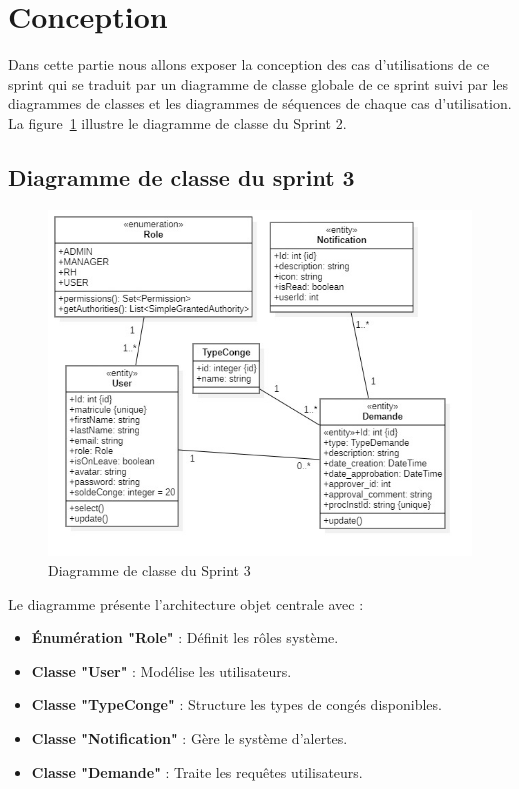 \section{Conception}
Dans cette partie nous allons exposer la conception des cas d’utilisations de ce sprint qui se traduit par un diagramme de 
classe globale de ce sprint suivi par les diagrammes de classes et les diagrammes de séquences de chaque cas d’utilisation.
La figure~\ref{fig:class_diagram_sprint3} illustre le diagramme de classe du Sprint 2.\\
\newpage
\subsection{Diagramme de classe du sprint 3}
\begin{figure}[h]
     \centering
     \includegraphics[width=15cm]{images/csprint3.jpg}
     \caption{Diagramme de classe du Sprint 3}
     \label{fig:class_diagram_sprint3}
\end{figure}
Le diagramme présente l'architecture objet centrale avec :\\
\begin{itemize}
    \item \textbf{Énumération "Role"} : Définit les rôles système.
    \item \textbf{Classe "User"} : Modélise les utilisateurs.
    \item \textbf{Classe "TypeConge"} : Structure les types de congés disponibles.
    \item \textbf{Classe "Notification"} : Gère le système d'alertes.
    \item \textbf{Classe "Demande"} : Traite les requêtes utilisateurs.
\end{itemize}
\newpage
\vspace{-1cm}
